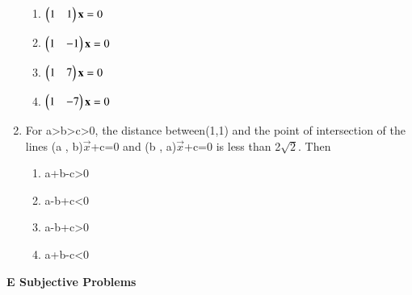 \begin{enumerate}
    \begin{enumerate}
     \item  $\begin{pmatrix}1 & 1\end{pmatrix} \mathbf {x} = 0$
     \item  $\begin{pmatrix}1 & -1\end{pmatrix} \mathbf {x} = 0$
     \item  $\begin{pmatrix}1 & 7\end{pmatrix} \mathbf {x} = 0$
     \item  $\begin{pmatrix}1 & -7\end{pmatrix} \mathbf {x} = 0$
     \end{enumerate}
    \item For a\textgreater b\textgreater c\textgreater 0, the distance between(1,1) and the point of intersection of the lines (a , b)$\vec {x}$+c=0 and (b , a)$\vec {x}$+c=0 is less than 2$\sqrt2$. Then 
    \begin{enumerate}
     \item  a+b-c\textgreater 0
     \item  a-b+c\textless 0
     \item  a-b+c\textgreater 0
     \item  a+b-c\textless 0
    \end{enumerate}
\end{enumerate}
{\Large \textbf{E Subjective Problems}}
